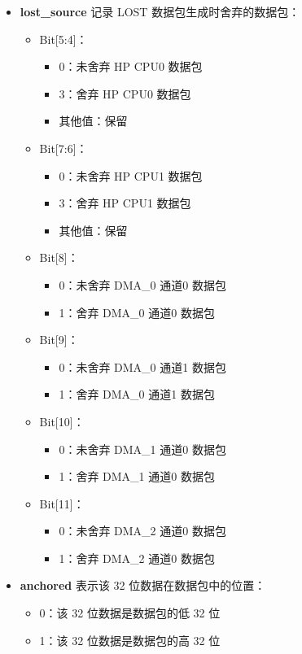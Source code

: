 \documentclass[main\_\_CN.tex]{subfiles}
\begin{document}
\begin{itemize}
    \item \textbf{lost\_source} 记录 LOST 数据包生成时舍弃的数据包：
        \begin{itemize}
            \item Bit[5:4]：
                \begin{itemize}
                    \item 0：未舍弃 HP CPU0 数据包
                    \item 3：舍弃 HP CPU0 数据包
                    \item 其他值：保留
                \end{itemize}
            \item Bit[7:6]：
                \begin{itemize}
                    \item 0：未舍弃 HP CPU1 数据包
                    \item 3：舍弃 HP CPU1 数据包
                    \item 其他值：保留
                \end{itemize}
            \item Bit[8]：
                \begin{itemize}
                    \item 0：未舍弃 DMA\_0 通道0 数据包
                    \item 1：舍弃 DMA\_0 通道0 数据包
                \end{itemize}
            \item Bit[9]：
                \begin{itemize}
                    \item 0：未舍弃 DMA\_0 通道1 数据包
                    \item 1：舍弃 DMA\_0 通道1 数据包
                \end{itemize}
            \item Bit[10]：
                \begin{itemize}
                    \item 0：未舍弃 DMA\_1 通道0 数据包
                    \item 1：舍弃 DMA\_1 通道0 数据包
                \end{itemize}
            \item Bit[11]：
                \begin{itemize}
                    \item 0：未舍弃 DMA\_2 通道0 数据包
                    \item 1：舍弃 DMA\_2 通道0 数据包
                \end{itemize}
        \end{itemize}
    \item \textbf{anchored} 表示该 32 位数据在数据包中的位置：
        \begin{itemize}
            \item 0：该 32 位数据是数据包的低 32 位
            \item 1：该 32 位数据是数据包的高 32 位
        \end{itemize}
\end{itemize}
\end{document}
